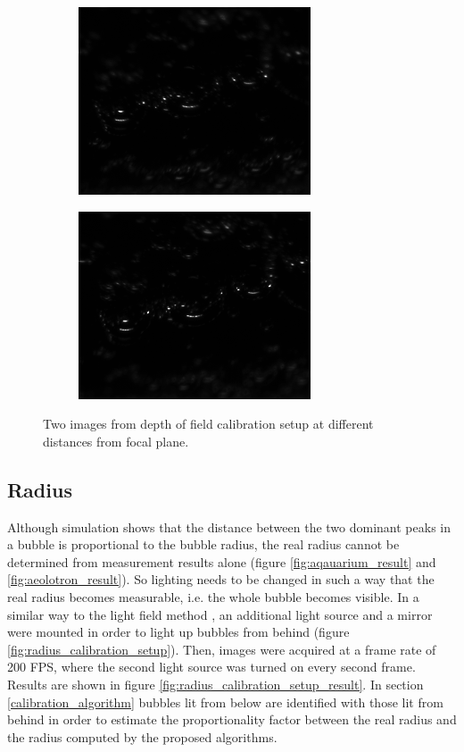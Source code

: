 			\begin{figure}
				\begin{subfigure}[b]{.55\textwidth}
					\centering
					\includegraphics[scale=.5]{images/dof_calib_1.png}
					\caption{}
				\end{subfigure}%
				\begin{subfigure}[b]{.55\textwidth}
					\centering
					\includegraphics[scale=.5]{images/dof_calib_2.png}
					\caption{}
				\end{subfigure}
				
				\caption{Two images from depth of field calibration setup at different distances from focal plane.}								
				\label{fig:depth_of_field_setup_result}
			\end{figure}
			
			
		\subsection{Radius}\label{sub:radius_setup}
			Although simulation shows that the distance between the two dominant peaks in a bubble is proportional to the bubble radius, the real radius cannot be determined from measurement results alone (figure \ref{fig:aqauarium_result} and \ref{fig:aeolotron_result}). So lighting needs to be changed in such a way that the real radius becomes measurable, i.e. the whole bubble becomes visible. In a similar way to the light field method \cite{MischlerDiss}, an additional light source and a mirror were mounted in order to light up bubbles from behind (figure \ref{fig:radius_calibration_setup}). Then, images were acquired at a frame rate of 200 FPS, where the second light source was turned on every second frame. Results are shown in figure \ref{fig:radius_calibration_setup_result}. In section \ref{calibration_algorithm} bubbles lit from below are identified with those lit from behind in order to estimate the proportionality factor between the real radius and the radius computed by the proposed algorithms. 
			

